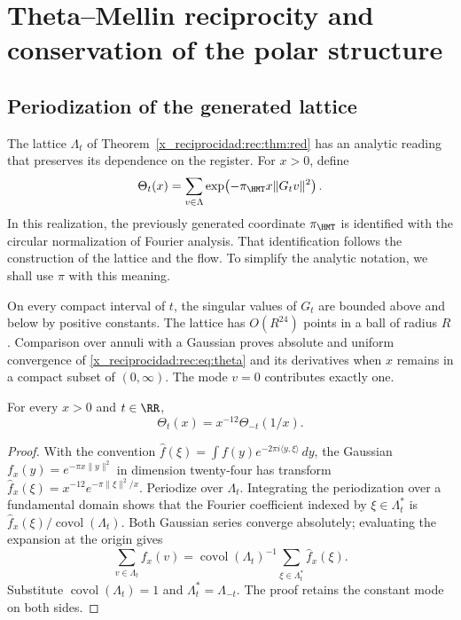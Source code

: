 \chapter{Theta--Mellin reciprocity and conservation of the polar structure}
\label{x_reciprocidad:rec:espectral}

\section{Periodization of the generated lattice}

The lattice \(\Lambda_t\) of Theorem~\ref{x_reciprocidad:rec:thm:red} has an analytic reading that preserves its dependence on the register. For \(x>0\), define
\begin{equation}
 \Theta_t(x)=\sum_{v\in\Lambda}
       \exp\!\left(-\pi_{\HMT}x\|G_tv\|^2\right).
 \label{x_reciprocidad:rec:eq:theta}
\end{equation}
In this realization, the previously generated coordinate \(\pi_{\HMT}\) is identified with the circular normalization of Fourier analysis. That identification follows the construction of the lattice and the flow. To simplify the analytic notation, we shall use \(\pi\) with this meaning.

On every compact interval of \(t\), the singular values of \(G_t\) are bounded above and below by positive constants. The lattice has \(O(R^{24})\) points in a ball of radius \(R\). Comparison over annuli with a Gaussian proves absolute and uniform convergence of \eqref{x_reciprocidad:rec:eq:theta} and its derivatives when \(x\) remains in a compact subset of \((0,\infty)\). The mode \(v=0\) contributes exactly one.

\begin{theorem}
\label{x_reciprocidad:rec:thm:theta}
For every \(x>0\) and \(t\in\RR\),
\begin{equation}
 \Theta_t(x)=x^{-12}\Theta_{-t}(1/x).
 \label{x_reciprocidad:rec:eq:theta-reciproca}
\end{equation}
\end{theorem}
\begin{proof}
With the convention \(\widehat f(\xi)=\int f(y)e^{-2\pi i\langle y,\xi\rangle}\,dy\), the Gaussian \(f_x(y)=e^{-\pi x\|y\|^2}\) in dimension twenty-four has transform
\(\widehat f_x(\xi)=x^{-12}e^{-\pi\|\xi\|^2/x}\).
Periodize over \(\Lambda_t\). Integrating the periodization over a fundamental domain shows that the Fourier coefficient indexed by \(\xi\in\Lambda_t^*\) is \(\widehat f_x(\xi)/\operatorname{covol}(\Lambda_t)\). Both Gaussian series converge absolutely; evaluating the expansion at the origin gives
\[
 \sum_{v\in\Lambda_t}f_x(v)
 =\operatorname{covol}(\Lambda_t)^{-1}
   \sum_{\xi\in\Lambda_t^*}\widehat f_x(\xi).
\]
Substitute \(\operatorname{covol}(\Lambda_t)=1\) and \(\Lambda_t^*=\Lambda_{-t}\). The proof retains the constant mode on both sides.
\end{proof}

